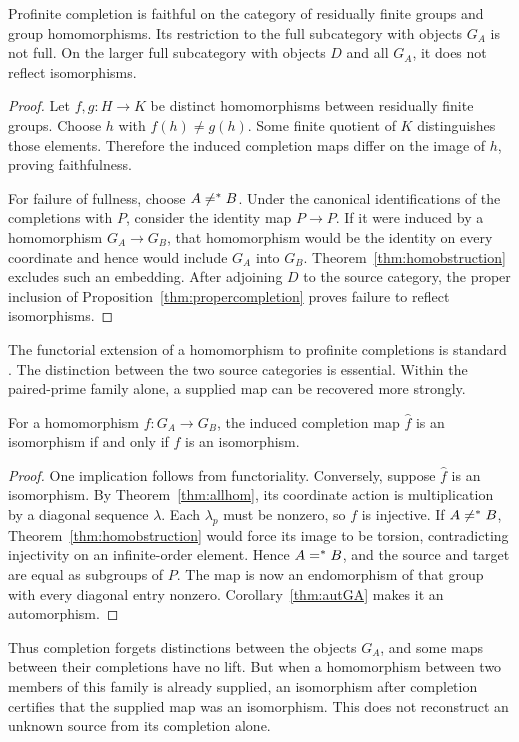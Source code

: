 \begin{proposition}
\label{thm:faithful}
Profinite completion is faithful on the category of residually finite groups and group homomorphisms. Its restriction to the full subcategory with objects $G_A$ is not full. On the larger full subcategory with objects $D$ and all $G_A$, it does not reflect isomorphisms.
\end{proposition}
\begin{proof}
Let $f,g:H\to K$ be distinct homomorphisms between residually finite groups. Choose $h$ with $f(h)\ne g(h)$. Some finite quotient of $K$ distinguishes those elements. Therefore the induced completion maps differ on the image of $h$, proving faithfulness.

For failure of fullness, choose $A\ne^{*} B$. Under the canonical identifications of the completions with $P$, consider the identity map $P\to P$. If it were induced by a homomorphism $G_A\to G_B$, that homomorphism would be the identity on every coordinate and hence would include $G_A$ into $G_B$. Theorem~\ref{thm:homobstruction} excludes such an embedding. After adjoining $D$ to the source category, the proper inclusion of Proposition~\ref{thm:propercompletion} proves failure to reflect isomorphisms.
\end{proof}
The functorial extension of a homomorphism to profinite completions is standard \cite[Proposition 3.1.2]{Wilkes}. The distinction between the two source categories is essential. Within the paired-prime family alone, a supplied map can be recovered more strongly.

\begin{proposition}
\label{thm:rankonereflection}
For a homomorphism $f:G_A\to G_B$, the induced completion map $\widehat f$ is an isomorphism if and only if $f$ is an isomorphism.
\end{proposition}
\begin{proof}
One implication follows from functoriality. Conversely, suppose $\widehat f$ is an isomorphism. By Theorem~\ref{thm:allhom}, its coordinate action is multiplication by a diagonal sequence $\lambda$. Each $\lambda_p$ must be nonzero, so $f$ is injective. If $A\ne^{*} B$, Theorem~\ref{thm:homobstruction} would force its image to be torsion, contradicting injectivity on an infinite-order element. Hence $A=^{*} B$, and the source and target are equal as subgroups of $P$. The map is now an endomorphism of that group with every diagonal entry nonzero. Corollary~\ref{thm:autGA} makes it an automorphism.
\end{proof}
Thus completion forgets distinctions between the objects $G_A$, and some maps between their completions have no lift. But when a homomorphism between two members of this family is already supplied, an isomorphism after completion certifies that the supplied map was an isomorphism. This does not reconstruct an unknown source from its completion alone.

